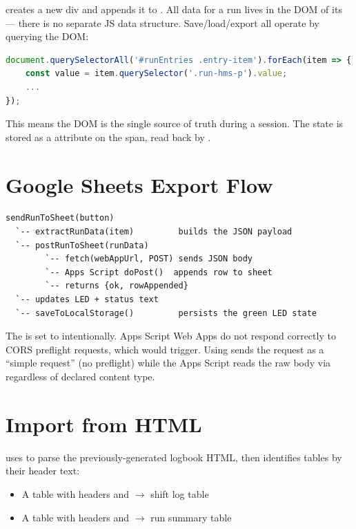  creates a new  div and appends it to
. All data for a run lives in the DOM of its
 --- there is no separate JS data structure.
Save/load/export all operate by querying the DOM:

\begin{lstlisting}[language=javascript]
document.querySelectorAll('#runEntries .entry-item').forEach(item => {
    const value = item.querySelector('.run-hms-p').value;
    ...
});
\end{lstlisting}

This means the DOM is the single source of truth during a session. The
 state is stored as a  attribute on the
 span, read back by .

\section{Google Sheets Export Flow}

\begin{lstlisting}
sendRunToSheet(button)
  `-- extractRunData(item)         builds the JSON payload
  `-- postRunToSheet(runData)
        `-- fetch(webAppUrl, POST) sends JSON body
        `-- Apps Script doPost()  appends row to sheet
        `-- returns {ok, rowAppended}
  `-- updates LED + status text
  `-- saveToLocalStorage()         persists the green LED state
\end{lstlisting}

The  is set to 
intentionally. Apps Script Web Apps do not respond correctly to CORS preflight
requests, which  would trigger. Using 
sends the request as a ``simple request'' (no preflight) while the Apps Script
reads the raw body via  regardless of declared
content type.

\section{Import from HTML}

 uses  to parse the
previously-generated logbook HTML, then identifies tables by their header
text:

\begin{itemize}
    \item A table with headers  and 
          $\rightarrow$ shift log table
    \item A table with headers  and 
          $\rightarrow$ run summary table
\end{itemize}

